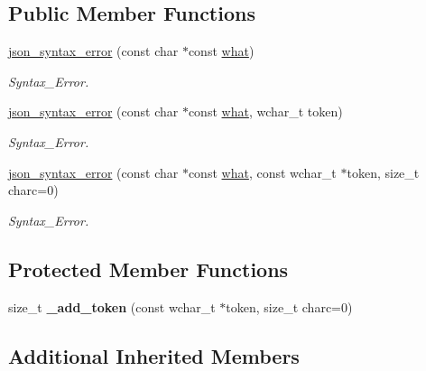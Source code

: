 \subsection*{Public Member Functions}
\begin{DoxyCompactItemize}
\item 
\hyperlink{classformat_1_1json__syntax__error_adc11f7d60bc9d8e69364205826df301b}{json\+\_\+syntax\+\_\+error} (const char $\ast$const \hyperlink{classformat_1_1json__error_ad485f2d9233498b1a66695f94e313dd5}{what})
\begin{DoxyCompactList}\small\item\em Syntax\+\_\+\+Error. \end{DoxyCompactList}\item 
\hyperlink{classformat_1_1json__syntax__error_a662ffb27c025c7934a57783a50b388df}{json\+\_\+syntax\+\_\+error} (const char $\ast$const \hyperlink{classformat_1_1json__error_ad485f2d9233498b1a66695f94e313dd5}{what}, wchar\+\_\+t token)
\begin{DoxyCompactList}\small\item\em Syntax\+\_\+\+Error. \end{DoxyCompactList}\item 
\hyperlink{classformat_1_1json__syntax__error_add967122801c06e55247d38bf1f5bef0}{json\+\_\+syntax\+\_\+error} (const char $\ast$const \hyperlink{classformat_1_1json__error_ad485f2d9233498b1a66695f94e313dd5}{what}, const wchar\+\_\+t $\ast$token, size\+\_\+t charc=0)
\begin{DoxyCompactList}\small\item\em Syntax\+\_\+\+Error. \end{DoxyCompactList}\end{DoxyCompactItemize}
\subsection*{Protected Member Functions}
\begin{DoxyCompactItemize}
\item 
size\+\_\+t {\bfseries \+\_\+add\+\_\+token} (const wchar\+\_\+t $\ast$token, size\+\_\+t charc=0)\hypertarget{classformat_1_1json__syntax__error_a3ed3b471ec7790e02a44176ad4ef64c3}{}\label{classformat_1_1json__syntax__error_a3ed3b471ec7790e02a44176ad4ef64c3}

\end{DoxyCompactItemize}
\subsection*{Additional Inherited Members}


